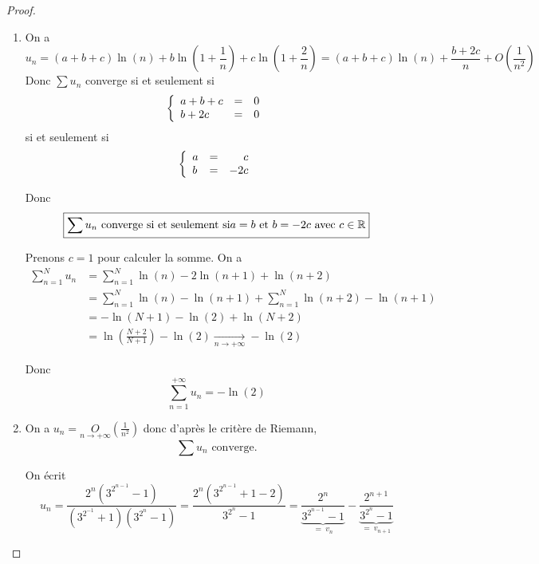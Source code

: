 \documentclass[12pt]{article}
\begin{document}
\begin{proof}
	\phantom{}
	\begin{enumerate}
		\item On a 
		\begin{equation}u_{n}=(a+b+c)\ln(n)+b\ln\left(1+\frac{1}{n}\right)+c\ln\left(1+\frac{2}{n}\right)=(a+b+c)\ln(n)+\frac{b+2c}{n}+O\left(\frac{1}{n^{2}}\right)\end{equation}
		Donc $\sum u_{n}$ converge si et seulement si 
		\begin{equation}
		\left\{
			\begin{array}[]{lcr}
				a+b+c &= &0\\
				b+2c &= &0
			\end{array}
		\right.
		\end{equation}
		si et seulement si 
		\begin{equation}
		\left\{
			\begin{array}[]{lcr}
				a &= &c\\
				b &= &-2c
			\end{array}
		\right.
		\end{equation}

		Donc 
		\begin{equation}\boxed{\sum u_{n}\text{ converge si et seulement si} a=b\text{ et }b=-2c\text{ avec }c\in\mathbb{R}}\end{equation}

		Prenons $c=1$ pour calculer la somme. On a 
		\begin{align}
			\sum_{n=1}^{N}u_{n}
			&=\sum_{n=1}^{N}\ln(n)-2\ln(n+1)+\ln(n+2)\\
			&=\sum_{n=1}^{N}\ln(n)-\ln(n+1)+\sum_{n=1}^{N}\ln(n+2)-\ln(n+1)\\
			&=-\ln(N+1)-\ln(2)+\ln(N+2)\\
			&=\ln\left(\frac{N+2}{N+1}\right)-\ln(2)\xrightarrow[n\to+\infty]{}-\ln(2)
		\end{align}

		Donc 
		\begin{equation}\boxed{\sum_{n=1}^{+\infty}u_{n}=-\ln(2)}\end{equation}

		\item On a $u_{n}=\underset{n\to+\infty}{O}\left(\frac{1}{n^{2}}\right)$ donc d'après le critère de Riemann,
		\begin{equation}\boxed{\sum u_{n}\text{ converge.}}\end{equation}

		On écrit 
		\begin{equation}u_{n}=\frac{2^{n}\left(3^{2^{n-1}}-1\right)}{\left(3^{2^{-1}}+1\right)\left(3^{2^{n}}-1\right)}=\frac{2^{n}\left(3^{2^{n-1}}+1-2\right)}{3^{2^{n}}-1}=\underbrace{\frac{2^{n}}{3^{2^{n-1}}-1}}_{=~v_{n}}-\underbrace{\frac{2^{n+1}}{3^{2^{n}}-1}}_{=~v_{n+1}}\end{equation}


\end{enumerate}
\end{proof}
\end{document}
